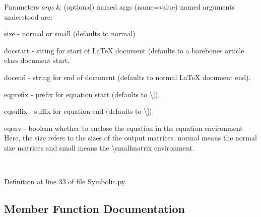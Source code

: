 \begin{DoxyParams}{Parameters}
{\em args} & (optional) named args (name=value) named arguments understood are\+:
\begin{DoxyItemize}
\item \textquotesingle{}size\textquotesingle{} -\/ \textquotesingle{}normal\textquotesingle{} or \textquotesingle{}small\textquotesingle{} (defaults to \textquotesingle{}normal\textquotesingle{})
\item \textquotesingle{}docstart\textquotesingle{} -\/ string for start of La\+TeX document (defaults to a barebones article class document start.
\item \textquotesingle{}docend\textquotesingle{} -\/ string for end of document (defaults to normal La\+TeX document end).
\item \textquotesingle{}eqprefix\textquotesingle{} -\/ prefix for equation start (defaults to \textbackslash{}\mbox{[}).
\item \textquotesingle{}eqsuffix\textquotesingle{} -\/ suffix for equation end (defaults to \textbackslash{}\mbox{]}).
\item \textquotesingle{}eqenv\textquotesingle{} -\/ boolean whether to enclose the equation in the equation environment Here, the size refers to the sizes of the output matrices. \textquotesingle{}normal\textquotesingle{} means the normal size matrices and \textquotesingle{}small\textquotesingle{} means the \textbackslash{}smallmatrix environment. 
\end{DoxyItemize}\\
\hline
\end{DoxyParams}


Definition at line 33 of file Symbolic.\+py.



\subsection{Member Function Documentation}
\mbox{\label{classSignalIntegrity_1_1SystemDescriptions_1_1Symbolic_1_1Symbolic_a26d16e796dfe67359239b0e44e7f6536}} 
